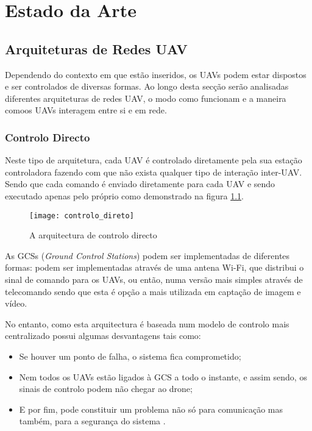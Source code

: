 \chapter{Estado da Arte} \label{chap:sota}

\section{Arquiteturas de Redes UAV}\label{sec:architectures}

Dependendo do contexto em que estão inseridos, os UAVs podem estar dispostos e ser controlados de diversas formas. Ao longo desta secção serão analisadas diferentes arquiteturas de redes UAV, o modo como funcionam e a maneira comoos UAVs interagem  entre si e em rede.

\subsection{Controlo Directo}
Neste tipo de arquitetura, cada UAV é controlado diretamente pela sua estação controladora fazendo com que não exista qualquer tipo de interação inter-UAV. Sendo que cada comando é enviado diretamente para cada UAV e sendo executado apenas pelo próprio como demonstrado na figura \ref{fig:controlo_directo}.

\begin{figure}[H]
\centering
\texttt{[image: controlo\_direto]}
\caption{A arquitectura de controlo directo \label{fig:controlo_directo}}
\end{figure}

As GCSs (\textit{Ground Control Stations}) podem ser implementadas de diferentes formas: podem ser implementadas através de uma antena Wi-Fi, que distribui o sinal de comando para os UAVs, ou então, numa versão mais simples através de telecomando sendo que esta é opção a mais utilizada em captação de imagem e vídeo.

No entanto, como esta arquitectura é baseada num modelo de controlo mais centralizado possui algumas desvantagens tais como: 

\begin{itemize}
\item Se houver um ponto de falha, o sistema fica comprometido;
\item Nem todos os UAVs estão ligados à GCS a todo o instante, e assim sendo, os sinais de controlo podem não chegar ao drone;
\item E por fim, pode constituir um problema não só para comunicação mas também, para a segurança do sistema \cite{ImadJawhar2017}.
\end{itemize}

